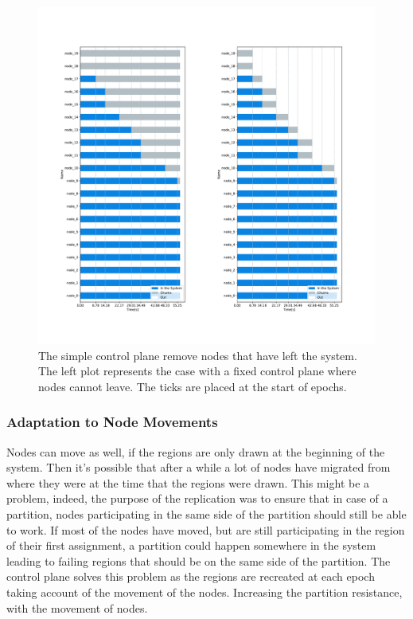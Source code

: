 \documentclass[a4paper,11pt,oneside]{report}
\begin{document}
\begin{figure}[!h] 
\centering
\includegraphics[width=450pt]{figures/ChurnSubplots}
\caption{The simple control plane remove nodes that have left the system. The
    left plot represents the case with a fixed control plane where nodes cannot
    leave. The ticks are placed at the start of epochs.}
    \label{fig:churn-comparision}
\end{figure}

\subsubsection{Adaptation to Node Movements}
Nodes can move as well, if the regions are only drawn at the beginning of the
system. Then it's possible that after a while a lot of nodes have migrated from
where they were at the time that the regions were drawn. This might be a
problem, indeed, the purpose of the replication was to ensure that in case of a
partition, nodes participating in the same side of the partition should still
be able to work. If most of the nodes have moved, but are still participating
in the region of their first assignment, a partition could happen somewhere in
the system leading to failing regions that should be on the same side of the
partition. The control plane solves this problem as the regions are recreated at
each epoch taking account of the movement of the nodes. Increasing the
partition resistance, with the movement of nodes.
\end{document}
